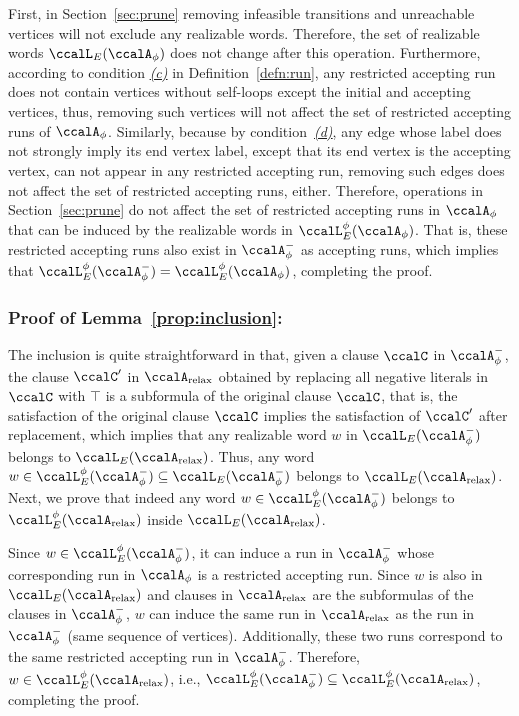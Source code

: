 \documentclass[Afour,sageh,times]{sagej}
\newcommand{\auto}[1]{\ccalA_{\textup{#1}}}
\newcommand{\autop}{\ccalA_{\phi}}
\begin{document}
{First, in Section~\ref{sec:prune} removing infeasible transitions and unreachable vertices will not exclude any realizable words. Therefore, the set of realizable words $\ccalL_E(\autop)$ does not change after this operation. Furthermore, according to condition \hyperref[cond:c]{\it (c)} in Definition~\ref{defn:run}, any restricted  accepting run  does not contain vertices without self-loops except the initial and accepting vertices, thus, removing such vertices  will not affect the  set of restricted accepting runs of $\autop$. Similarly, because by condition~\hyperref[cond:d]{\it (d)}, any edge whose label does not strongly imply its end vertex label, except that its end vertex is the accepting vertex,  can not appear in any restricted accepting run, removing such edges does not affect the set of restricted accepting runs, either.  Therefore, operations in Section~\ref{sec:prune}  do not affect the set of restricted accepting runs in $\autop$ that can be induced by the realizable words  in $\ccalL^\phi_E(\autop)$. That is, these restricted accepting runs also exist in $\autop^-$ as accepting runs, which implies that $\ccalL^\phi_E(\autop^-) = \ccalL^\phi_E(\autop)$, completing the proof.


\subsubsection{Proof of Lemma~\ref{prop:inclusion}:}\label{app:inclusion}
The inclusion is quite straightforward in that, given a clause $\ccalC$ in $\autop^-$, the clause $\ccalC'$ in $\auto{relax}$ obtained by replacing all negative literals in $\ccalC$ with $\top$ is a subformula of the original clause $\ccalC$, that is, the satisfaction of the original clause $\ccalC$ implies the satisfaction of $\ccalC'$ after replacement, which implies that any realizable word $w$ in $\ccalL_E(\autop^-)$ belongs to $\ccalL_E(\auto{relax})$. Thus, any word $w \in \ccalL^\phi_E(\autop^-)  \subseteq  \ccalL_E(\autop^-)$ belongs to $\ccalL_E(\auto{relax})$. Next, we prove that indeed any word $w \in \ccalL^\phi_E(\autop^-)$ belongs to  $\ccalL^\phi_E(\auto{relax})$ inside $ \ccalL_E(\auto{relax})$.

Since $w \in \ccalL^\phi_E(\autop^-)$, it can induce  a run in $\autop^-$ whose corresponding run in $\autop$ is a restricted accepting run. Since $w$ is also in $\ccalL_E(\auto{relax})$ and clauses in $\auto{relax}$ are the subformulas of the clauses in $\autop^-$, $w$ can induce the same run in $\auto{relax}$ as the run in $\autop^-$ (same sequence of vertices). Additionally, these two runs correspond to the same restricted accepting run in $\autop^-$. Therefore, $w \in \ccalL^\phi_E(\auto{relax})$, i.e.,  $\ccalL^\phi_E(\autop^-)\subseteq \ccalL^\phi_E(\auto{relax})$, completing the proof.

}
\end{document}
